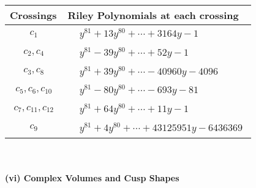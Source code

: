 \documentclass[1p]{elsarticle_modified}
\theoremstyle{definition}
\begin{document}
\begin{tabular}{m{50pt}|m{274pt}}
Crossings & \hspace{64pt}Riley Polynomials at each crossing \\
\hline $$\begin{aligned}c_{1}\end{aligned}$$&$\begin{aligned}
&y^{81}+13 y^{80}+\cdots+3164 y-1
\end{aligned}$\\
\hline $$\begin{aligned}c_{2},c_{4}\end{aligned}$$&$\begin{aligned}
&y^{81}-39 y^{80}+\cdots+52 y-1
\end{aligned}$\\
\hline $$\begin{aligned}c_{3},c_{8}\end{aligned}$$&$\begin{aligned}
&y^{81}+39 y^{80}+\cdots-40960 y-4096
\end{aligned}$\\
\hline $$\begin{aligned}c_{5},c_{6},c_{10}\end{aligned}$$&$\begin{aligned}
&y^{81}-80 y^{80}+\cdots-693 y-81
\end{aligned}$\\
\hline $$\begin{aligned}c_{7},c_{11},c_{12}\end{aligned}$$&$\begin{aligned}
&y^{81}+64 y^{80}+\cdots+11 y-1
\end{aligned}$\\
\hline $$\begin{aligned}c_{9}\end{aligned}$$&$\begin{aligned}
&y^{81}+4 y^{80}+\cdots+43125951 y-6436369
\end{aligned}$\\
\hline
\end{tabular}\\~\\
\newpage\flushleft \textbf{(vi) Complex Volumes and Cusp Shapes}
\end{document}
